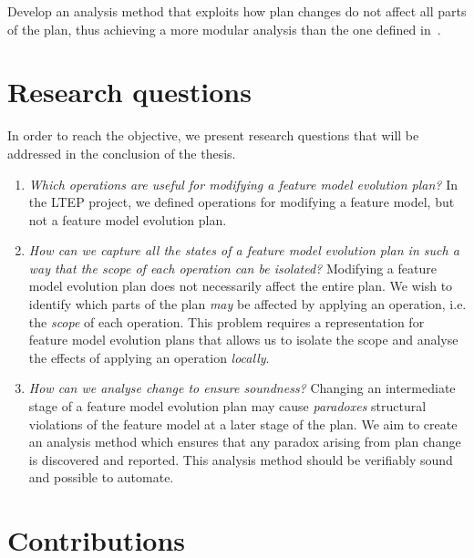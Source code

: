 Develop an analysis method that exploits how plan changes do not affect all parts of the plan, thus achieving a more modular analysis than the one defined in~\cite{art:consistency-preserving-evolution-planning}.

\section{Research questions}
\label{sec:research-questions}

In order to reach the objective, we present research questions that will be addressed in the conclusion of the thesis.

\begin{enumerate}[\itbf{RQ\arabic*}, itemsep=0mm]
   \item \textit{Which operations are useful for modifying a feature model evolution plan?} In the LTEP project, we defined operations for modifying a feature model, but not a feature model evolution plan. \label{rq1}
   \item \textit{How can we capture all the states of a feature model evolution plan in such a way that the scope of each operation can be isolated?} Modifying a feature model evolution plan does not necessarily affect the entire plan. We wish to identify which parts of the plan \emph{may} be affected by applying an operation, i.e. the \emph{scope} of each operation. This problem requires a representation for feature model evolution plans that allows us to isolate the scope and analyse the effects of applying an operation \emph{locally}. \label{rq2}
   \item \textit{How can we analyse change to ensure soundness?} 
      Changing an intermediate stage of a feature model evolution plan may cause \emph{paradoxes} \textemdash{} structural violations of the feature model \textemdash{} at a later stage of the plan. 
      We aim to create an analysis method which ensures that any paradox arising from plan change is discovered and reported. This analysis method should be verifiably sound and possible to automate. \label{rq3}
\end{enumerate}

\section{Contributions}

